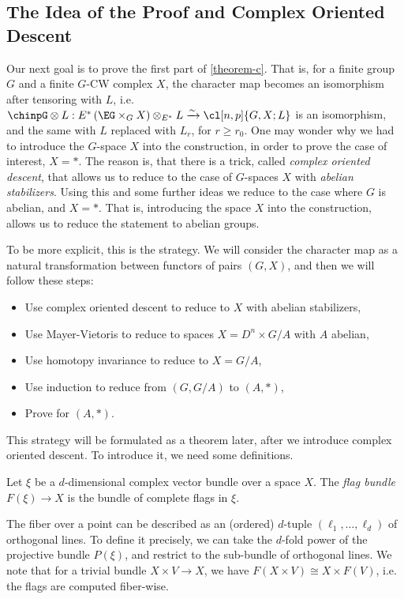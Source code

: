 \subsection{The Idea of the Proof and Complex Oriented Descent}

Our next goal is to prove the first part of \cref{theorem-c}.
That is, for a finite group $G$ and a finite $G$-CW complex $X$, the character map becomes an isomorphism after tensoring with $L$, i.e.
$\chinpG \otimes L: E^*\left(\EG \times_G X\right) \otimes_{E^*} L \xrightarrow{\sim} \cl[n,p]{G,X; L}$
is an isomorphism, and the same with $L$ replaced with $L_r$, for $r \geq r_0$.
One may wonder why we had to introduce the $G$-space $X$ into the construction, in order to prove the case of interest, $X = *$.
The reason is, that there is a trick, called \emph{complex oriented descent}, that allows us to reduce to the case of $G$-spaces $X$ with \emph{abelian stabilizers}.
Using this and some further ideas we reduce to the case where $G$ is abelian, and $X = *$.
That is, introducing the space $X$ into the construction, allows us to reduce the statement to abelian groups.

To be more explicit, this is the strategy.
We will consider the character map as a natural transformation between functors of pairs $\left(G, X\right)$, and then we will follow these steps:
\begin{itemize}
	\item Use complex oriented descent to reduce to $X$ with abelian stabilizers,
	\item Use Mayer-Vietoris to reduce to spaces $X = D^n \times G/A$ with $A$ abelian,
	\item Use homotopy invariance to reduce to $X = G/A$,
	\item Use induction to reduce from $\left(G, G/A\right)$ to $\left(A, *\right)$,
	\item Prove for $\left(A, *\right)$.
\end{itemize}

This strategy will be formulated as a theorem later, after we introduce complex oriented descent.
To introduce it, we need some definitions.

\begin{definition}
	Let $\xi$ be a $d$-dimensional complex vector bundle over a space $X$.
	The \emph{flag bundle} $F\left(\xi\right) \to X$ is the bundle of complete flags in $\xi$.
\end{definition}

The fiber over a point can be described as an (ordered) $d$-tuple $\left(\ell_1, \dotsc, \ell_d\right)$ of orthogonal lines.
To define it precisely, we can take the $d$-fold power of the projective bundle $P\left(\xi\right)$, and restrict to the sub-bundle of orthogonal lines.
We note that for a trivial bundle $X \times V \to X$, we have $F\left(X \times V\right) \cong X \times F\left(V\right)$, i.e. the flags are computed fiber-wise.

